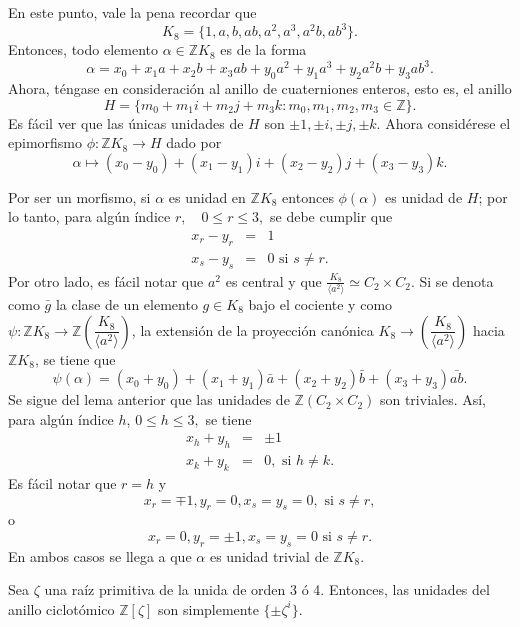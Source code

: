 \begin{proof*}
En este punto, vale la pena recordar que \[ K_8 = \{ 1,a,b,ab,a^2,a^3,a^2b,ab^3  \}.\] Entonces, todo elemento $\alpha \in \mathds{Z}K_8$ es de la forma \[ \alpha = x_0 + x_1a + x_2b + x_3ab + y_0a^2 + y_1a^3 + y_2a^2b + y_3ab^3.\] Ahora, téngase en consideración al anillo de cuaterniones enteros, esto es, el anillo \[ H = \{ m_0 + m_1i+ m_2j +m_3k \colon m_0, m_1, m_2, m_3 \in \mathds{Z} \}.\] Es fácil ver que las únicas unidades de $H$ son $\pm 1, \pm i, \pm j, \pm k.$ Ahora considérese el epimorfismo $\phi \colon \mathds{Z}K_8 \to H$ dado por \[ \alpha \mapsto (x_0 - y_0) + (x_1 - y_1)i + (x_2 - y_2)j +(x_3-y_3)k. \]

Por ser un morfismo, si $\alpha$ es unidad en $\mathds{Z}K_8$ entonces $\phi(\alpha)$ es unidad de $H$; por lo tanto, para algún índice $r, \quad 0 \leq r \leq 3,$ se debe cumplir que 
\begin{eqnarray*}
x_r - y_r &=&1 \\  
x_s - y_s &=& 0 \mbox{ si } s \neq r .
\end{eqnarray*}
Por otro lado, es fácil notar que $a^2$  es central y que $\frac{K_8}{\langle a^2\rangle} \simeq C_2 \times C_2.$ Si se denota como $\bar{g}$ la clase de un elemento $g \in K_8$ bajo el cociente y como $\psi \colon \mathds{Z}K_8 \to \mathds{Z}\left(\dfrac{K_8}{\langle a^2\rangle}\right)$, la extensión de la proyección canónica $K_8 \to \left( \dfrac{K_8}{\langle a^2\rangle} \right)$ hacia $\mathds{Z}K_8$, se tiene que \[ \psi(\alpha) = (x_0 + y_0) +(x_1 + y_1) \bar{a} + (x_2 + y_2)\bar{b} + (x_3+y_3)\bar{ab}.\] Se sigue del lema anterior que las unidades de $\mathds{Z}(C_2\times C_2)$ son triviales. Así, para algún índice $h$, $0\leq h \leq 3,$ se tiene 
 \begin{eqnarray*}
 x_h + y_h &=& \pm 1 \\
 x_k + y_k &=& 0, \mbox{ si } h \neq k.
 \end{eqnarray*}
 Es fácil notar que $r = h$ y \[ x_r = \mp 1, y_r =0, x_s = y_s =0, \mbox{ si } s \neq r, \] o 
 \[ x_r =0 , y_r = \pm 1, x_s = y_s = 0 \mbox{ si } s \neq r.  \] En ambos casos se llega a que $\alpha$ es unidad trivial de $\mathds{Z}K_8$.
\end{proof*}
\begin{lema}\label{lema:tercerLema}
Sea $\zeta$ una raíz primitiva de la unida de orden 3 ó 4. Entonces, las unidades del anillo ciclotómico $\mathds{Z}[\zeta]$ son simplemente $\{\pm \zeta^{i} \}$.
\end{lema}
